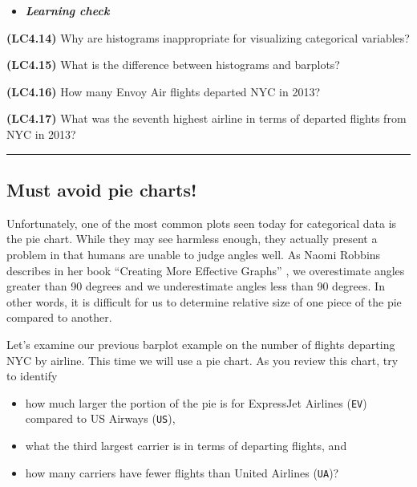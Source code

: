 \documentclass[]{tufte-book}
\let\oldrule=\rule
\renewcommand{\rule}[1]{\oldrule{\linewidth}}
\providecommand{\tightlist}{%
  \setlength{\itemsep}{0pt}\setlength{\parskip}{0pt}}
\newenvironment{rmdblock}[1]
  {\begin{shaded*}
  \begin{itemize}
  \renewcommand{\labelitemi}{
    \raisebox{-.7\height}[0pt][0pt]{
    }
  }
  \item
  }
  {
  \end{itemize}
  \end{shaded*}
  }
\newenvironment{learncheck}
  {\begin{rmdblock}{warning}}
  {\end{rmdblock}}
\begin{document}
\begin{learncheck}
\textbf{\emph{Learning check}}
\end{learncheck}

\textbf{(LC4.14)} Why are histograms inappropriate for visualizing
categorical variables?

\textbf{(LC4.15)} What is the difference between histograms and
barplots?

\textbf{(LC4.16)} How many Envoy Air flights departed NYC in 2013?

\textbf{(LC4.17)} What was the seventh highest airline in terms of
departed flights from NYC in 2013?

\begin{center}\rule{0.5\linewidth}{\linethickness}\end{center}

\subsection{Must avoid pie charts!}\label{must-avoid-pie-charts}

Unfortunately, one of the most common plots seen today for categorical
data is the pie chart. While they may see harmless enough, they actually
present a problem in that humans are unable to judge angles well. As
Naomi Robbins describes in her book ``Creating More Effective Graphs''
\citep{robbins2013}, we overestimate angles greater than 90 degrees and
we underestimate angles less than 90 degrees. In other words, it is
difficult for us to determine relative size of one piece of the pie
compared to another.

Let's examine our previous barplot example on the number of flights
departing NYC by airline. This time we will use a pie chart. As you
review this chart, try to identify

\begin{itemize}
\tightlist
\item
  how much larger the portion of the pie is for ExpressJet Airlines
  (\texttt{EV}) compared to US Airways (\texttt{US}),
\item
  what the third largest carrier is in terms of departing flights, and
\item
  how many carriers have fewer flights than United Airlines
  (\texttt{UA})?
\end{itemize}
\end{document}
